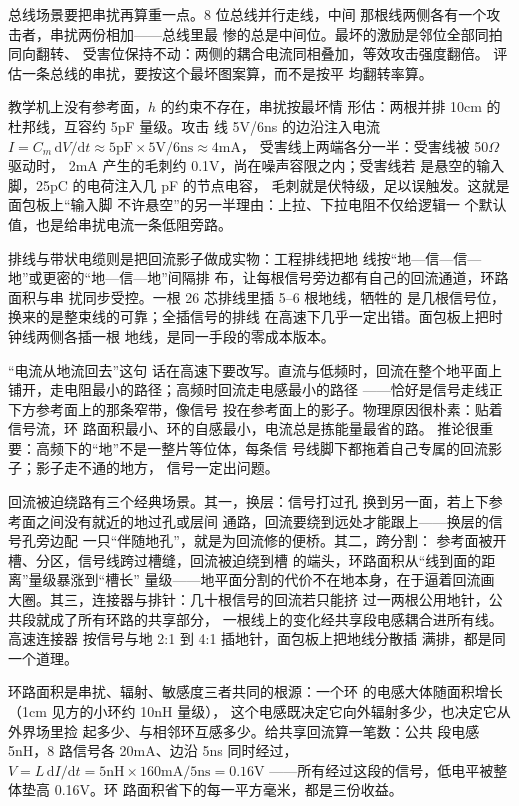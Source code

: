 总线场景要把串扰再算重一点。8 位总线并行走线，中间
那根线两侧各有一个攻击者，串扰两份相加——总线里最
惨的总是中间位。最坏的激励是邻位全部同拍同向翻转、
受害位保持不动：两侧的耦合电流同相叠加，等效攻击强度翻倍。
评估一条总线的串扰，要按这个最坏图案算，而不是按平
均翻转率算。

教学机上没有参考面，$h$ 的约束不存在，串扰按最坏情
形估：两根并排 10cm 的杜邦线，互容约 5pF 量级。攻击
线 5V/6ns 的边沿注入电流
$I=C_m\,\mathrm{d}V/\mathrm{d}t\approx5\text{pF}\times5\text{V}/6\text{ns}\approx4$mA，
受害线上两端各分一半：受害线被 50$\Omega$ 驱动时，
2mA 产生的毛刺约 0.1V，尚在噪声容限之内；受害线若
是悬空的输入脚，25pC 的电荷注入几 pF 的节点电容，
毛刺就是伏特级，足以误触发。这就是面包板上“输入脚
不许悬空”的另一半理由：上拉、下拉电阻不仅给逻辑一
个默认值，也是给串扰电流一条低阻旁路。

排线与带状电缆则是把回流影子做成实物：工程排线把地
线按“地—信—信—地”或更密的“地—信—地”间隔排
布，让每根信号旁边都有自己的回流通道，环路面积与串
扰同步受控。一根 26 芯排线里插 5--6 根地线，牺牲的
是几根信号位，换来的是整束线的可靠；全插信号的排线
在高速下几乎一定出错。面包板上把时钟线两侧各插一根
地线，是同一手段的零成本版本。

“电流从地流回去”这句
话在高速下要改写。直流与低频时，回流在整个地平面上
铺开，走电阻最小的路径；高频时回流走电感最小的路径
——恰好是信号走线正下方参考面上的那条窄带，像信号
投在参考面上的影子。物理原因很朴素：贴着信号流，环
路面积最小、环的自感最小，电流总是拣能量最省的路。
推论很重要：高频下的“地”不是一整片等位体，每条信
号线脚下都拖着自己专属的回流影子；影子走不通的地方，
信号一定出问题。

回流被迫绕路有三个经典场景。其一，换层：信号打过孔
换到另一面，若上下参考面之间没有就近的地过孔或层间
通路，回流要绕到远处才能跟上——换层的信号孔旁边配
一只“伴随地孔”，就是为回流修的便桥。其二，跨分割：
参考面被开槽、分区，信号线跨过槽缝，回流被迫绕到槽
的端头，环路面积从“线到面的距离”量级暴涨到“槽长”
量级——地平面分割的代价不在地本身，在于逼着回流画
大圈。其三，连接器与排针：几十根信号的回流若只能挤
过一两根公用地针，公共段就成了所有环路的共享部分，
一根线上的变化经共享段电感耦合进所有线。高速连接器
按信号与地 2:1 到 4:1 插地针，面包板上把地线分散插
满排，都是同一个道理。

环路面积是串扰、辐射、敏感度三者共同的根源：一个环
的电感大体随面积增长（1cm 见方的小环约 10nH 量级），
这个电感既决定它向外辐射多少，也决定它从外界场里捡
起多少、与相邻环互感多少。给共享回流算一笔数：公共
段电感 5nH，8 路信号各 20mA、边沿 5ns 同时经过，
$V=L\,\mathrm{d}I/\mathrm{d}t=5\text{nH}\times160\text{mA}/5\text{ns}=0.16$V
——所有经过这段的信号，低电平被整体垫高 0.16V。环
路面积省下的每一平方毫米，都是三份收益。

